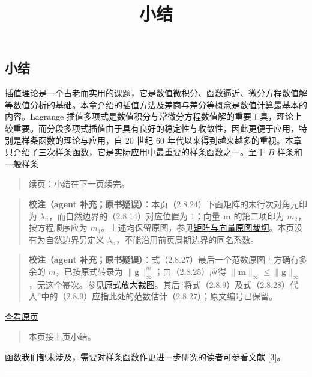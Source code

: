 \documentclass[
  10pt,
  fontset=fandol]{ctexart}
\title{小结}
\author{}
\date{}
\begin{document}
\maketitle

\subsection{小结}\label{ux5c0fux7ed3}

插值理论是一个古老而实用的课题，它是数值微积分、函数逼近、微分方程数值解等数值分析的基础。本章介绍的插值方法及差商与差分等概念是数值计算最基本的内容。Lagrange 插值多项式是数值积分与常微分方程数值解的重要工具，理论上较重要。而分段多项式插值由于具有良好的稳定性与收敛性，因此更便于应用，特别是样条函数的理论与应用，自 20 世纪 60 年代以来得到越来越多的重视。本章只介绍了三次样条函数，它是实际应用中最重要的样条函数之一。至于 \(B\) 样条和一般样条

\begin{quote}
续页：小结在下一页续完。
\end{quote}

\begin{quote}
\textbf{校注（agent 补充；原书疑误）}：本页（2.8.24）下面矩阵的末行次对角元印为 \(\lambda_n\)，而自然边界的（2.8.14）对应位置为 \(1\)；向量 \(\boldsymbol m\) 的第二项印为 \(m_2\)，按方程顺序应为 \(m_1\)。上述均保留原图，参见\href{../assets/ch02b/pdf-055-matrix-detail.png}{矩阵与向量原图裁切}。本页没有为自然边界另定义 \(\lambda_n\)，不能沿用前页周期边界的同名系数。
\end{quote}

\begin{quote}
\textbf{校注（agent 补充；原书疑误）}：式（2.8.27）最后一个范数原图上方确有多余的 \(m\)，已按原式转录为 \(\|\boldsymbol g\|_\infty^m\)；由（2.8.25）应得 \(\|\boldsymbol m\|_\infty\leqslant\|\boldsymbol g\|_\infty\)，无这个幂次。参见\href{../assets/ch02b/pdf-055-eq-2-8-27-detail.png}{原式放大裁图}。其后``将式（2.8.9）及式（2.8.28）代入''中的（2.8.9）应指此处的范数估计（2.8.27）；原文编号已保留。
\end{quote}

\href{../../source-images/pdf-056.jpeg}{查看原页}

\begin{quote}
本页接上页小结。
\end{quote}

函数我们都未涉及，需要对样条函数作更进一步研究的读者可参看文献 {[}3{]}。

\begin{center}\rule{0.5\linewidth}{0.5pt}\end{center}
\end{document}
